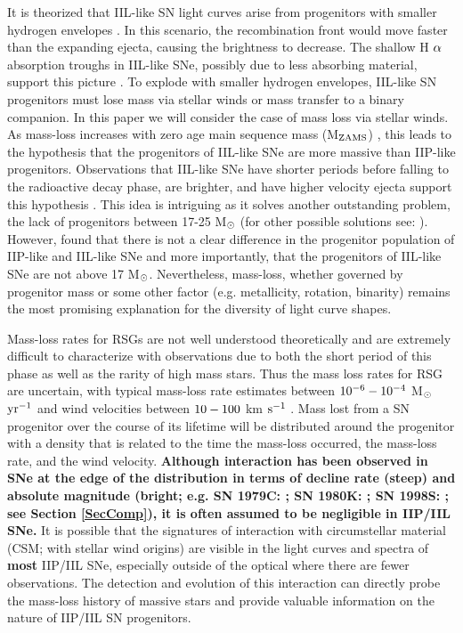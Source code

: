 \documentclass[a4paper,fleqn,usenatbib]{mnras}
\newcommand{\msun}{M$\rm{_{\odot}}$ }
\newcommand{\msunperiod}{M$\rm{_{\odot}}$}
\begin{document}
It is theorized that IIL-like SN light curves arise from progenitors with  smaller hydrogen envelopes \citep{1971grassberg,1989branch,1993blinnikov}.
In this scenario, the recombination front would move faster than the expanding ejecta, causing the brightness to decrease. 
The shallow H $\rm{\alpha}$ absorption troughs in IIL-like SNe, possibly due to less absorbing material, support this picture \citep{1996schlegel,2014gutierrez}.
To explode with smaller hydrogen envelopes, IIL-like SN progenitors must lose mass via stellar winds or mass transfer to a binary companion.
In this paper we will consider the case of mass loss via stellar winds.
As mass-loss increases with zero age main sequence mass (M$\rm{_{ZAMS}}$)  \citep{2003heger,2009kasen}, this leads to the hypothesis that the progenitors of IIL-like SNe are more massive than IIP-like progenitors. 
Observations that IIL-like SNe have shorter periods before falling to the radioactive decay phase, are brighter, and have higher velocity ejecta support this hypothesis \citep{1994patat,2014gutierrez,2014anderson,2014faran,2015sanders,2015valenti,2016valenti}.
This idea is intriguing as it solves another outstanding problem, the lack of progenitors between 17-25 \msun \citep{2015smartt} (for other possible solutions see: \citealt{2018davies, 2012walmswell}).
However, \citet{2016valenti} found that there is not a clear difference in the progenitor population of IIP-like and IIL-like SNe and more importantly, that the progenitors of IIL-like SNe are not above 17 \msunperiod.
Nevertheless, mass-loss, whether governed by progenitor mass or some other factor (e.g. metallicity, rotation, binarity) remains the most promising explanation for the diversity of light curve shapes.

Mass-loss rates for RSGs are not well understood theoretically and are extremely difficult to characterize with observations due to both the short period of this phase as well as the rarity of high mass stars.
Thus the mass loss rates for RSG are uncertain, with typical mass-loss rate estimates between $\rm{10^{-6}-10^{-4}}$ \msunperiod $\rm{yr^{-1}}$ and wind velocities between $\rm{10-100}$ km $\rm{s^{-1}}$ \citep{2011mauron}.
Mass lost from a SN progenitor over the course of its lifetime will be distributed around the progenitor with a density that is related to the time the mass-loss occurred, the mass-loss rate, and the wind velocity.
\textbf{Although interaction has been observed in SNe at the edge of the distribution in terms of decline rate (steep) and absolute magnitude (bright; e.g. SN 1979C: \citealt{1993blinnikov}; SN 1980K: \citealt{1992chugai}; SN 1998S: \citealt{2001chugai}; see Section \ref{SecComp}), it is often assumed to be negligible in IIP/IIL SNe.}
It is possible that the signatures of interaction with circumstellar material (CSM; with stellar wind origins) are visible in the light curves and spectra of \textbf{most} IIP/IIL SNe, especially outside of the optical where there are fewer observations.
The detection and evolution of this interaction can directly probe the mass-loss history of massive stars and provide valuable information on the nature of IIP/IIL SN progenitors.
\end{document}
